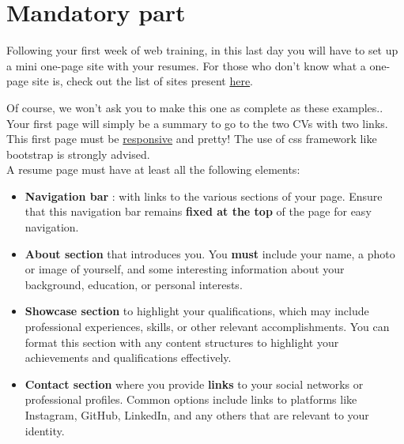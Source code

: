 \documentclass[12pt, a4paper]{report}
\begin{document}
\chapter{Mandatory part}

	Following your first week of web training, in this last day you will have to set up a mini
	one-page site with your resumes. For those who don't know what a one-page site is, check
	out the list of sites present \href{https://bootstrapmade.com/bootstrap-resume-cv-templates/}{here}.

	\vspace{.2cm}Of course, we won't ask you to make this one as complete as these examples..\\

	\vspace{.2cm}Your first page will simply be a summary to go to the two CVs with two links.\\

	\vspace{.2cm}This first page must be \href{https://www.w3schools.com/html/html_responsive.asp}{responsive} and pretty! The use of css framework like bootstrap is strongly advised.\\

	A resume page must have at least all the following elements:

	\begin{itemize}

		\item \textbf{Navigation bar} : with links to the various sections of your page. Ensure that this navigation bar remains \textbf{fixed at the top} of the page for easy navigation.

		\item  \textbf{About section} that introduces you. You \textbf{must} include your name, a photo or image of yourself, and some interesting information about your background, education, or personal interests.

		\item  \textbf{Showcase section} to highlight your qualifications, which may include professional experiences, skills, or other relevant accomplishments. You can format this section with any content structures to highlight your achievements and qualifications effectively.

		\item  \textbf{Contact section} where you provide \textbf{links} to your social networks or professional profiles. Common options include links to platforms like Instagram, GitHub, LinkedIn, and any others that are relevant to your identity.

	\end{itemize}
\end{document}
